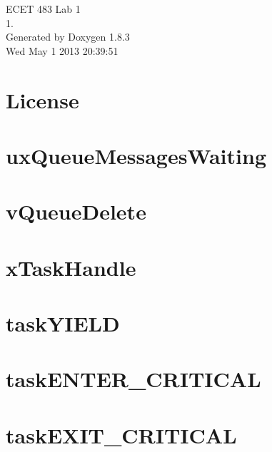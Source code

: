 \documentclass{book}
\begin{document}
\hypersetup{pageanchor=false,citecolor=blue}
\begin{titlepage}
\vspace*{7cm}
\begin{center}
{\Large E\-C\-E\-T 483 Lab 1 \\[1ex]\large 1. }\\
\vspace*{1cm}
{\large Generated by Doxygen 1.8.3}\\
\vspace*{0.5cm}
{\small Wed May 1 2013 20:39:51}\\
\end{center}
\end{titlepage}
\clearemptydoublepage
{}
\tableofcontents
\clearemptydoublepage
{}
\hypersetup{pageanchor=true,citecolor=blue}
\chapter{License}
\label{License}
\hypertarget{License}{}

\chapter{ux\-Queue\-Messages\-Waiting}
\label{uxQueueMessagesWaiting}
\hypertarget{uxQueueMessagesWaiting}{}

\chapter{v\-Queue\-Delete}
\label{vQueueDelete}
\hypertarget{vQueueDelete}{}

\chapter{x\-Task\-Handle}
\label{xTaskHandle}
\hypertarget{xTaskHandle}{}

\chapter{task\-Y\-I\-E\-L\-D}
\label{taskYIELD}
\hypertarget{taskYIELD}{}

\chapter{task\-E\-N\-T\-E\-R\-\_\-\-C\-R\-I\-T\-I\-C\-A\-L}
\label{taskENTER_CRITICAL}
\hypertarget{taskENTER_CRITICAL}{}

\chapter{task\-E\-X\-I\-T\-\_\-\-C\-R\-I\-T\-I\-C\-A\-L}
\label{taskEXIT_CRITICAL}
\hypertarget{taskEXIT_CRITICAL}{}

\end{document}
